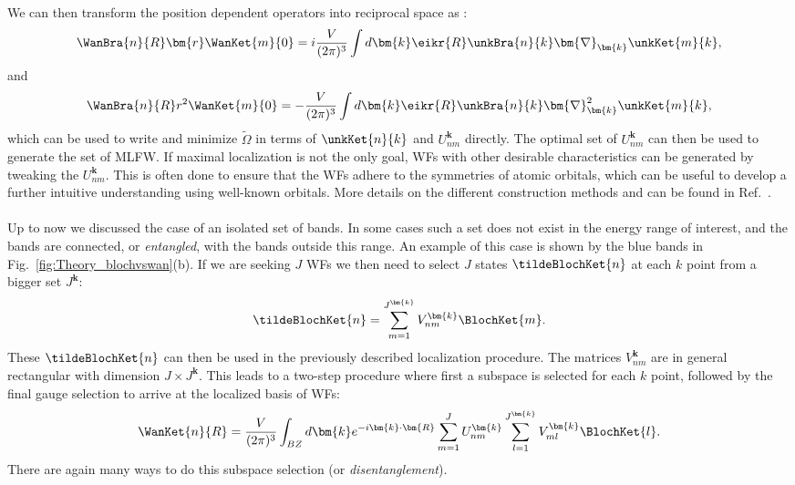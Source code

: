 We can then transform the position dependent operators into reciprocal space as \cite{Blount1962}:
\begin{equation}
\WanBra{n}{R}\bm{r}\WanKet{m}{0} = i \frac{V}{(2\pi)^3}\int d\bm{k} \eikr{R}\unkBra{n}{k} \bm{\nabla}_{\bm{k}} \unkKet{m}{k},
\end{equation}
and
\begin{equation}
\WanBra{n}{R}r^2\WanKet{m}{0} = -\frac{V}{(2\pi)^3}\int d\bm{k} \eikr{R}\unkBra{n}{k} \bm{\nabla}_{\bm{k}}^2 \unkKet{m}{k},
\end{equation}
which can be used to write and minimize $\tilde\Omega$ in terms of $\unkKet{n}{k}$ and $U_{nm}^{\bm{k}}$ directly.
The optimal set of $U_{nm}^{\bm{k}}$ can then be used to generate the set of MLFW.
If maximal localization is not the only goal, WFs with other desirable characteristics can be generated by tweaking the $U_{nm}^{\bm{k}}$.
This is often done to ensure that the WFs adhere to the symmetries of atomic orbitals, which can be useful to develop a further intuitive understanding using well-known orbitals.
More details on the different construction methods and can be found in Ref.~\cite{Marzari2012}.
\\\\
Up to now we discussed the case of an isolated set of bands. In some cases such a set does not exist in the energy range of interest, and the bands are connected, or {\it entangled}, with the bands outside this range.
An example of this case is shown by the blue bands in Fig.~\ref{fig:Theory_blochvswan}(b).
If we are seeking $J$ WFs we then need to select $J$ states $\tildeBlochKet{n}$ at each $k$ point from a bigger set $J^{\bm{k}}$:
\begin{equation}
	\tildeBlochKet{n} = \sum_{m=1}^{J^{\bm{k}}}V_{nm}^{\bm{k}} \BlochKet{m}.
\end{equation}
These $\tildeBlochKet{n}$ can then be used in the previously described localization procedure.
The matrices $V_{nm}^{\bm{k}}$ are in general rectangular with dimension $J\times J^{\bm{k}}$.
This leads to a two-step procedure where first a subspace is selected for each $k$ point, followed by the final gauge selection to arrive at the localized basis of WFs:
\begin{equation}
	\label{eq:Theory_fullwan}
	\WanKet{n}{R} = \frac{V}{(2\pi)^3} \int_{BZ} d\bm{k} e^{-i \bm{k} \cdot \bm{R}} \sum_{m=1}^J U^{\bm{k}}_{nm} \sum_{l=1}^{J^{\bm{k}}} V_{ml}^{\bm{k}} \BlochKet{l}.
\end{equation}
There are again many ways to do this subspace selection (or {\it disentanglement}).
